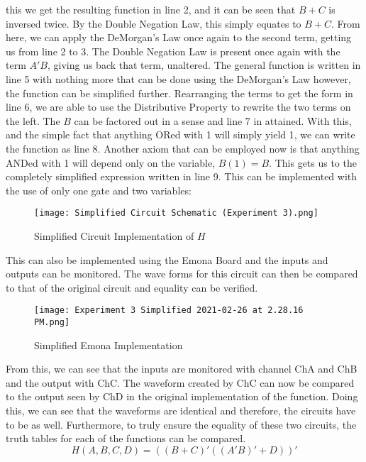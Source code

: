 \documentclass[12pt]{article}
\begin{document}
    this we get the resulting function in line 2, and it can be seen that $B+C$
    is inversed twice. By the Double Negation Law, this simply equates to $B+C$.
    From here, we can apply the DeMorgan's Law once again to the second term,
    getting us from line 2 to 3. The Double Negation Law is present once again
    with the term $A'B$, giving us back that term, unaltered. The general
    function is written in line 5 with nothing more that can be done using the
    DeMorgan's Law however, the function can be simplified further. Rearranging
    the terms to get the form in line 6, we are able to use the Distributive
    Property to rewrite the two terms on the left. The $B$ can be factored out
    in a sense and line 7 in attained. With this, and the simple fact that
    anything ORed with 1 will simply yield 1, we can write the function as line
    8. Another axiom that can be employed now is that anything ANDed with 1 will
    depend only on the variable, $B(1)=B$. This gets us to the completely
    simplified expression written in line 9. This can be implemented with the
    use of only one gate and two variables:
    \begin{figure}[h]
        \centering
        \texttt{[image: Simplified Circuit Schematic
        (Experiment 3).png]}
        \caption{Simplified Circuit Implementation of $H$}%
    \end{figure}
    \par This can also be implemented using the Emona Board and the inputs and
    outputs can be monitored. The wave forms for this circuit can then be
    compared to that of the original circuit and equality can be verified.
    \begin{figure}[h]
        \centering
        \texttt{[image: Experiment 3 Simplified
        2021-02-26 at 2.28.16 PM.png]}
        \caption{Simplified Emona Implementation}%
    \end{figure}
    \par From this, we can see that the inputs are monitored with channel ChA
    and ChB and the output with ChC. The waveform created by ChC can now be
    compared to the output seen by ChD in the original implementation of the
    function. Doing this, we can see that the waveforms are identical and
    therefore, the circuits have to be as well. Furthermore, to truly ensure the
    equality of these two circuits, the truth tables for each of the functions
    can be compared.
    \[
        H\left(A,B,C,D\right) = ((B+C)'((A'B)'+D))'
    \]
\end{document}
